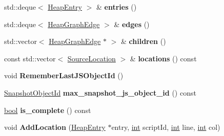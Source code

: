 \begin{DoxyCompactItemize}
std\+::deque$<$ \mbox{\hyperlink{classv8_1_1internal_1_1HeapEntry}{Heap\+Entry}} $>$ \& {\bfseries entries} ()
\item 
\mbox{\label{classv8_1_1internal_1_1HeapSnapshot_a2865e9f46584bd30c43d104c02241fce}} 
std\+::deque$<$ \mbox{\hyperlink{classv8_1_1internal_1_1HeapGraphEdge}{Heap\+Graph\+Edge}} $>$ \& {\bfseries edges} ()
\item 
\mbox{\label{classv8_1_1internal_1_1HeapSnapshot_a5c91fa9078fba4625cec3330c730c73d}} 
std\+::vector$<$ \mbox{\hyperlink{classv8_1_1internal_1_1HeapGraphEdge}{Heap\+Graph\+Edge}} $\ast$ $>$ \& {\bfseries children} ()
\item 
\mbox{\label{classv8_1_1internal_1_1HeapSnapshot_a36b4f35dce8b6f62b8bcde3434231266}} 
const std\+::vector$<$ \mbox{\hyperlink{structv8_1_1internal_1_1SourceLocation}{Source\+Location}} $>$ \& {\bfseries locations} () const
\item 
\mbox{\label{classv8_1_1internal_1_1HeapSnapshot_a728b4c7878a21901a906fca5f0880d98}} 
void {\bfseries Remember\+Last\+J\+S\+Object\+Id} ()
\item 
\mbox{\label{classv8_1_1internal_1_1HeapSnapshot_a35ced2c7dcdbede622282f2b93aab3bd}} 
\mbox{\hyperlink{classuint32__t}{Snapshot\+Object\+Id}} {\bfseries max\+\_\+snapshot\+\_\+js\+\_\+object\+\_\+id} () const
\item 
\mbox{\label{classv8_1_1internal_1_1HeapSnapshot_af733d3871ba284b459d5a7efed5d42e0}} 
\mbox{\hyperlink{classbool}{bool}} {\bfseries is\+\_\+complete} () const
\item 
\mbox{\label{classv8_1_1internal_1_1HeapSnapshot_a8e0861799ccc8e659cb9d0d4d285a3ef}} 
void {\bfseries Add\+Location} (\mbox{\hyperlink{classv8_1_1internal_1_1HeapEntry}{Heap\+Entry}} $\ast$entry, \mbox{\hyperlink{classint}{int}} script\+Id, \mbox{\hyperlink{classint}{int}} line, \mbox{\hyperlink{classint}{int}} col)
\item 
\mbox{\label{classv8_1_1internal_1_1HeapSnapshot_a9028b9fa71881d3260ef1b037d58d4f6}} 

\end{DoxyCompactItemize}
